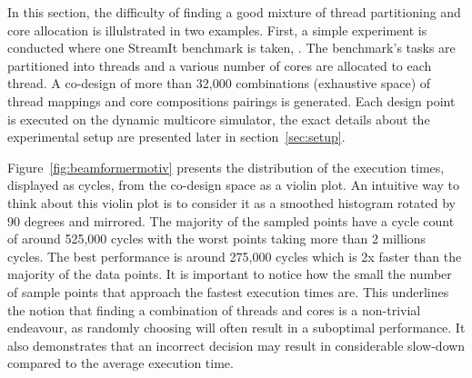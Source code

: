 In this section, the difficulty of finding a good mixture of thread partitioning and core allocation is illulstrated in two examples.
First, a simple experiment is conducted where one StreamIt benchmark is taken, .
The benchmark's tasks are partitioned into threads and a various number of cores are allocated to each thread.
A co-design of more than 32,000 combinations (exhaustive space) of thread mappings and core compositions pairings is generated.
Each design point is executed on the dynamic multicore simulator, the exact details about the experimental setup are presented later in section~\ref{sec:setup}.

Figure~\ref{fig:beamformermotiv} presents the distribution of the execution times, displayed as cycles, from the co-design space as a violin plot.
An intuitive way to think about this violin plot is to consider it as a smoothed histogram rotated by 90 degrees and mirrored.
The majority of the sampled points have a cycle count of around 525,000 cycles with the worst points taking more than 2 millions cycles.
The best performance is around 275,000 cycles which is 2x faster than the majority of the data points.
It is important to notice how the small the number of sample points that approach the fastest execution times are.
This underlines the notion that finding a combination of threads and cores is a non-trivial endeavour, as randomly choosing will often result in a suboptimal performance.
It also demonstrates that an incorrect decision may result in considerable slow-down compared to the average execution time.

